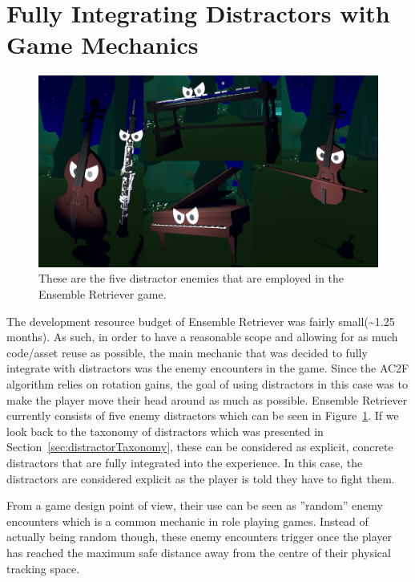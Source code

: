 \section{Fully Integrating Distractors with Game Mechanics}
\begin{figure}[tbph]
    \centering
    \includegraphics[width=1\textwidth]{figures/screenshots/Distractors.png}
    \caption[The Distractors of Ensemble Retriever]{These are the five distractor enemies that are employed in the Ensemble Retriever game.}
    \label{fig:allDistractors}
\end{figure}

The development resource budget of Ensemble Retriever was fairly small(\textasciitilde1.25 months). As such, in order to have a reasonable scope and allowing for as much code/asset reuse as possible, the main mechanic that was decided to fully integrate with distractors was the enemy encounters in the game. Since the AC2F algorithm relies on rotation gains, the goal of using distractors in this case was to make the player move their head around as much as possible. Ensemble Retriever currently consists of five enemy distractors which can be seen in Figure~\ref{fig:allDistractors}. If we look back to the taxonomy of distractors which was presented in Section~\ref{sec:distractorTaxonomy}, these can be considered as explicit, concrete distractors that are fully integrated into the experience. In this case, the distractors are considered explicit as the player is told they have to fight them. 

From a game design point of view, their use can be seen as ''random'' enemy encounters which is a common mechanic in role playing games. Instead of actually being random though, these enemy encounters trigger once the player has reached the maximum safe distance away from the centre of their physical tracking space. 

